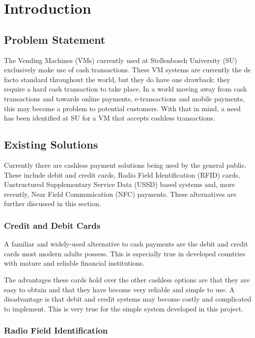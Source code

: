 \chapter{Introduction}
\label{chap:1}

\section{Problem Statement}

The Vending Machines (VMs) currently used at Stellenbosch University (SU)
exclusively make use of cash transactions. These VM systems are currently the
de facto standard throughout the world, but they do have one drawback:
they require a hard cash transaction to take place. In a world moving away from
cash transactions and towards online payments, e-transactions and mobile
payments, this may become a problem to potential customers. With that in mind, a need has
been identified at SU for a VM that accepts cashless transactions.

\section{Existing Solutions}

Currently there are cashless payment solutions being used by the general public.
These include debit and credit cards, Radio Field Identification (RFID) cards,
Unstructured Supplementary Service Data (USSD) based systems and, more recently, Near
Field Communication (NFC) payments. These alternatives are further discussed in this
section.

\subsection{Credit and Debit Cards}

A familiar and widely-used alternative to cash payments are the debit and
credit cards most modern adults possess. This is especially
true in developed countries with mature and reliable financial institutions.

The advantages these cards hold over the other cashless options are
that they are easy to obtain and that they have become very
reliable and simple to use. A disadvantage is that debit and credit systems may become
costly and complicated to implement. This is very true for the simple system developed in
this project.

\subsection{Radio Field Identification}

